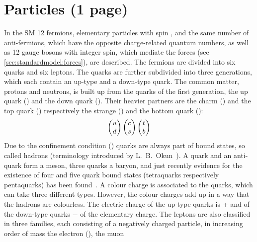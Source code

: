 
\section{Particles (1 page)}
\label{sec:standardmodel:particles}

In the SM 12 fermions, elementary particles with spin , and the
same number of anti-fermions, which have the opposite charge-related quantum
numbers, as well as 12 gauge bosons with integer spin, which mediate the
forces (see \cref{sec:standardmodel:forces}), are described. The fermions are
divided into six quarks and six leptons. The quarks are further subdivided
into three generations, which each contain an up-type and a down-type quark.
The common matter, protons and neutrons, is built up from the quarks of the
first generation, the up quark (\uquark) and the down quark (\dquark). Their
heavier partners are the charm (\cquark) and the top quark (\tquark)
respectively the strange (\squark) and the bottom quark (\bquark):
\begin{align}
\begin{pmatrix}
{\ensuremath{u}} \\ {d}
\end{pmatrix}
\begin{pmatrix}
{\ensuremath{c}} \\ {s}
\end{pmatrix}
\begin{pmatrix}
{\ensuremath{t}}	\\ {b}
\end{pmatrix}
\end{align}
Due to the confinement condition () quarks are
always part of bound states, so called hadrons (terminology introduced by
L.~B.~Okun~\cite{Okun:1962kca}). A quark and an anti-quark form a meson, three
quarks a baryon, and just recently evidence for the existence of four and five
quark bound states (tetraquarks respectively pentaquarks) has been
found~\cite{LHCb-PAPER-2016-018,*LHCb-PAPER-2016-019,LHCb-PAPER-2015-029,LHCb-PAPER-2016-015}.
A colour charge is associated to the quarks, which can take three different
types. However, the colour charges add up in a way that the hadrons are
colourless. The electric charge of the up-type quarks is + and of
the down-type quarks $-$ of the elementary charge. The leptons are
also classified in three families, each consisting of a negatively charged
particle, in increasing order of mass the electron (\electron), the muon
